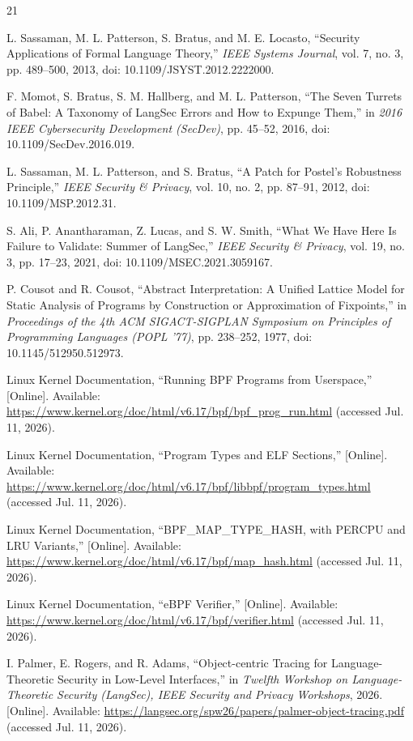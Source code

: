 \documentclass[conference]{IEEEtran}
\begin{document}
\begin{thebibliography}{21}

L. Sassaman, M. L. Patterson, S. Bratus, and M. E. Locasto, ``Security Applications of Formal Language Theory,'' \emph{IEEE Systems Journal}, vol. 7, no. 3, pp. 489--500, 2013, doi: 10.1109/JSYST.2012.2222000.

F. Momot, S. Bratus, S. M. Hallberg, and M. L. Patterson, ``The Seven Turrets of Babel: A Taxonomy of LangSec Errors and How to Expunge Them,'' in \emph{2016 IEEE Cybersecurity Development (SecDev)}, pp. 45--52, 2016, doi: 10.1109/SecDev.2016.019.

L. Sassaman, M. L. Patterson, and S. Bratus, ``A Patch for Postel's Robustness Principle,'' \emph{IEEE Security \& Privacy}, vol. 10, no. 2, pp. 87--91, 2012, doi: 10.1109/MSP.2012.31.

S. Ali, P. Anantharaman, Z. Lucas, and S. W. Smith, ``What We Have Here Is Failure to Validate: Summer of LangSec,'' \emph{IEEE Security \& Privacy}, vol. 19, no. 3, pp. 17--23, 2021, doi: 10.1109/MSEC.2021.3059167.

P. Cousot and R. Cousot, ``Abstract Interpretation: A Unified Lattice Model for Static Analysis of Programs by Construction or Approximation of Fixpoints,'' in \emph{Proceedings of the 4th ACM SIGACT-SIGPLAN Symposium on Principles of Programming Languages (POPL '77)}, pp. 238--252, 1977, doi: 10.1145/512950.512973.

Linux Kernel Documentation, ``Running BPF Programs from Userspace,'' [Online]. Available: \url{https://www.kernel.org/doc/html/v6.17/bpf/bpf_prog_run.html} (accessed Jul. 11, 2026).

Linux Kernel Documentation, ``Program Types and ELF Sections,'' [Online]. Available: \url{https://www.kernel.org/doc/html/v6.17/bpf/libbpf/program_types.html} (accessed Jul. 11, 2026).

Linux Kernel Documentation, ``BPF\_MAP\_TYPE\_HASH, with PERCPU and LRU Variants,'' [Online]. Available: \url{https://www.kernel.org/doc/html/v6.17/bpf/map_hash.html} (accessed Jul. 11, 2026).

Linux Kernel Documentation, ``eBPF Verifier,'' [Online]. Available: \url{https://www.kernel.org/doc/html/v6.17/bpf/verifier.html} (accessed Jul. 11, 2026).

I. Palmer, E. Rogers, and R. Adams, ``Object-centric Tracing for Language-Theoretic Security in Low-Level Interfaces,'' in \emph{Twelfth Workshop on Language-Theoretic Security (LangSec), IEEE Security and Privacy Workshops}, 2026. [Online]. Available: \url{https://langsec.org/spw26/papers/palmer-object-tracing.pdf} (accessed Jul. 11, 2026).


\end{thebibliography}
\end{document}
